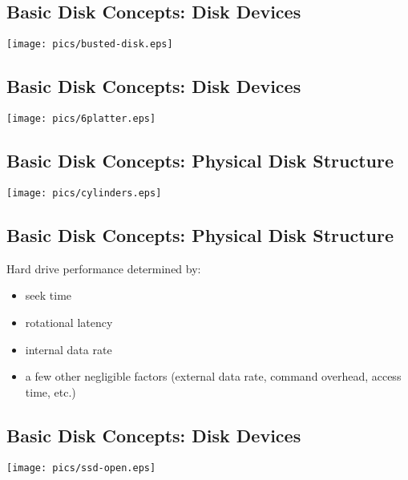 \documentclass[xga]{xdvislides}
\begin{document}
\subsection{Basic Disk Concepts: Disk Devices}
	\begin{center}
		\texttt{[image: pics/busted-disk.eps]} \\
	\end{center}

\subsection{Basic Disk Concepts: Disk Devices}
\vfill
	\begin{center}
		\texttt{[image: pics/6platter.eps]} \\
	\end{center}
\vfill

\subsection{Basic Disk Concepts: Physical Disk Structure}
\vfill
	\begin{center}
		\texttt{[image: pics/cylinders.eps]} \\
	\end{center}
\vfill

\subsection{Basic Disk Concepts: Physical Disk Structure}
Hard drive performance determined by:
\begin{itemize}
	\item seek time
	\item rotational latency
	\item internal data rate
	\item a few other negligible factors (external data rate, command
		overhead, access time, etc.)
\end{itemize}

\subsection{Basic Disk Concepts: Disk Devices}
\begin{center}
	\texttt{[image: pics/ssd-open.eps]} \\
\end{center}
\end{document}

